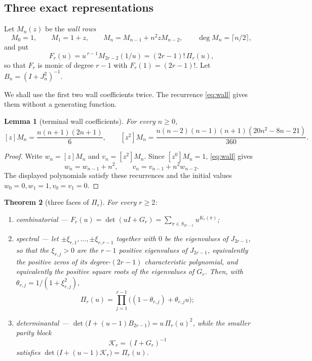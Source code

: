 \documentclass[11pt,a4paper]{article}
\theoremstyle{plain}
\newtheorem{theorem}{Theorem}[section]
\newtheorem{lemma}[theorem]{Lemma}
\theoremstyle{definition}
\theoremstyle{remark}
\begin{document}
\subsection{Three exact representations}

Let $M_n(z)$ be the \emph{wall rows}
\begin{equation}\label{eq:wall}
  M_0=1,\qquad M_1=1+z,\qquad M_n=M_{n-1}+n^2zM_{n-2},
  \qquad \deg M_n=\lceil n/2\rceil,
\end{equation}
and put
\begin{equation}\label{eq:Fr}
  F_r(u)=u^{\,r-1}M_{2r-2}(1/u)=(2r-1)!\,\Pi_r(u),
\end{equation}
so that $F_r$ is monic of degree $r-1$ with $F_r(1)=(2r-1)!$. Let
$B_n=(I+J_n^2)^{-1}$.

We shall use the first two wall coefficients twice. The recurrence
\eqref{eq:wall} gives them without a generating function.

\begin{lemma}[terminal wall coefficients]\label{lem:wall12}
For every $n\ge0$,
\[
  [z]M_n=\frac{n(n+1)(2n+1)}6,
  \qquad
  [z^2]M_n=
  \frac{n(n-2)(n-1)(n+1)(20n^2-8n-21)}{360}.
\]
\end{lemma}

\begin{proof}
Write $w_n=[z]M_n$ and $v_n=[z^2]M_n$. Since $[z^0]M_n=1$,
\eqref{eq:wall} gives
\[
  w_n=w_{n-1}+n^2,\qquad v_n=v_{n-1}+n^2w_{n-2}.
\]
The displayed polynomials satisfy these recurrences and the initial values
$w_0=0,w_1=1,v_0=v_1=0$.
\end{proof}

\begin{theorem}[three faces of $\Pi_r$]\label{thm:three}
For every $r\ge2$:
\begin{enumerate}[label=\textup{(\roman*)},leftmargin=2.2em]
\item \emph{combinatorial} ---
  $\displaystyle F_r(u)=\det(uI+G_r)=\sum_{\pi\in S_{2r-1}}u^{K_r(\pi)}$;
\item \emph{spectral} --- let $\pm\xi_{r,1},\dots,\pm\xi_{r,r-1}$ together with
  $0$ be the eigenvalues of $J_{2r-1}$, so that the $\xi_{r,j}>0$ are the
  $r-1$ positive eigenvalues of $J_{2r-1}$, equivalently the positive zeros of
  its degree-$(2r-1)$ characteristic polynomial, and equivalently the positive
  square roots of the eigenvalues of $G_r$. Then, with
  $\theta_{r,j}=1/(1+\xi_{r,j}^2)$,
  \[
    \Pi_r(u)=\prod_{j=1}^{r-1}\bigl((1-\theta_{r,j})+\theta_{r,j}u\bigr);
  \]
\item \emph{determinantal} ---
  $\det\bigl(I+(u-1)B_{2r-1}\bigr)=u\,\Pi_r(u)^2$, while the smaller parity
  block
  \[
    \mathcal K_r=(I+G_r)^{-1}
  \]
  satisfies $\det\bigl(I+(u-1)\mathcal K_r\bigr)=\Pi_r(u)$.
\end{enumerate}
\end{theorem}
\end{document}
